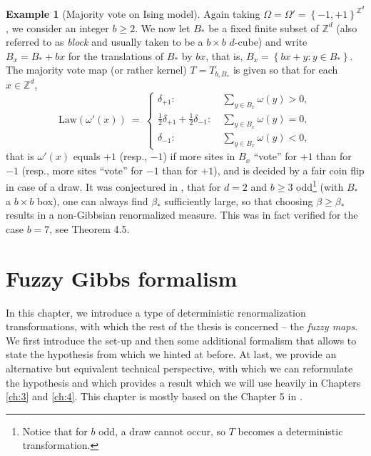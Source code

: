 \documentclass[12pt]{article}
\newcommand{\Z}{\mathbb{Z}}
\newcommand{\set}[1]{\left\{#1\right\}}
\newcommand{\1}{\mathbbm{1}}
\newcommand{\5}{\vspace{0.5cm}}
\theoremstyle{definition}
\newtheorem{ex}[thm]{Example}
\begin{document}
\begin{ex}[Majority vote on Ising model]
Again taking $\Omega=\Omega'=\set{-1,+1}^{\Z^d}$, we consider an integer $b\geq 2$. We now let $B_*$ be a fixed finite subset of $\Z^d$ (also referred to as \textit{block} and usually taken to be a $b\times b$ $d$-cube) and write $B_x=B_*+bx$ for the translations of $B_*$ by $bx$, that is, $B_x=\set{bx+y:y\in B_*}$. The majority vote map (or rather kernel) $T=T_{b,B_*}$ is given so that for each $x\in\Z^d$,
$$\mathrm{Law}(\omega'(x)) ~=~ \begin{cases}
\delta_{+1}: ~&\sum_{y\in B_x}\omega(y)>0, \\
\frac{1}{2}\delta_{+1}+\frac{1}{2}\delta_{-1}: ~&\sum_{y\in B_x}\omega(y)=0, \\
\delta_{-1}: ~&\sum_{y\in B_x}\omega(y)<0,
\end{cases}$$
that is $\omega'(x)$ equals $+1$ (resp., $-1$) if more sites in $B_x$ ``vote'' for $+1$ than for $-1$ (resp., more sites ``vote'' for $-1$ than for $+1$), and is decided by a fair coin flip in case of a draw. It was conjectured in \cite{EFS}, that for $d=2$ and $b\geq 3$ odd\footnote{Notice that for $b$ odd, a draw cannot occur, so $T$ becomes a deterministic transformation.} (with $B_*$ a $b\times b$ box), one can always find $\beta_*$ sufficiently large, so that choosing $\beta\geq\beta_*$ results in a non-Gibbsian renormalized measure. This was in fact verified for the case $b=7$, see Theorem 4.5. 
\end{ex}


\pagebreak


\section{Fuzzy Gibbs formalism}\label{ch:2}

In this chapter, we introduce a type of deterministic renormalization transformations, with which the rest of the thesis is concerned -- the \textit{fuzzy maps}. We first introduce the set-up and then some additional formalism that allows to state the hypothesis from \cite{EFS} which we hinted at before. At last, we provide an alternative but equivalent technical perspective, with which we can reformulate the hypothesis and which provides a result which we will use heavily in Chapters \ref{ch:3} and \ref{ch:4}. This chapter is mostly based on the Chapter 5 in \cite{Ber}.
\end{document}
